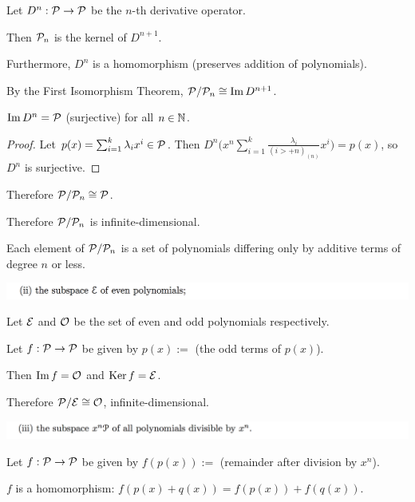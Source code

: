 \documentclass[12pt]{article}
\begin{document}
Let $D^n:\mathcal P \to \mathcal P$ be the $n$-th derivative operator.

Then $\mathcal P_n$ is the kernel of $D^{n+1}$.

Furthermore, $D^n$ is a homomorphism (preserves addition of polynomials).

By the First Isomorphism Theorem, $\mathcal P/\mathcal P_n \cong \operatorname{\mathrm{Im}} D^{n+1}$.

\begin{claim*}
  $\operatorname{\mathrm{Im}} D^n = \mathcal P$ (surjective) for all $n \in \mathbb{N}$.
\end{claim*}

\begin{proof}
  Let $p(x) = \sum_{i=1}^k\lambda_ix^i \in \mathcal P$. Then
  $D^n \Big(x^n\sum_{i=1}^k\frac{\lambda_i}{(i>+n)_{(n)}}x^i\Big) = p(x)$, so $D^n$ is surjective.
\end{proof}

Therefore $\mathcal P/\mathcal P_n \cong \mathcal P$.

Therefore $\mathcal P/\mathcal P_n$ is infinite-dimensional.

\begin{remark*}
Each element of $\mathcal P/\mathcal P_n$ is a set of polynomials differing only by additive terms
of degree $n$ or less.
\end{remark*}

\begin{mdframed}
\includegraphics[width=400pt]{img/linear-algebra-a0-2-2-2.png}
\end{mdframed}
Let $\mathcal E$ and $\mathcal O$ be the set of even and odd polynomials respectively.

Let $f:\mathcal P \to \mathcal P$ be given by $p(x) := $ (the odd terms of $p(x)$).

Then $\operatorname{\mathrm{Im}} f = \mathcal O$ and $\operatorname{\mathrm{Ker}} f = \mathcal E$.

Therefore $\mathcal P/\mathcal E \cong \mathcal O$, infinite-dimensional.


\begin{mdframed}
\includegraphics[width=400pt]{img/linear-algebra-a0-2-2-3.png}
\end{mdframed}
Let $f: \mathcal P \to \mathcal P$ be given by $f(p(x)) := $ (remainder after division by $x^n$).

\begin{claim*}
  $f$ is a homomorphism: $f(p(x) + q(x)) = f(p(x)) + f(q(x))$.
\end{claim*}
\end{document}
